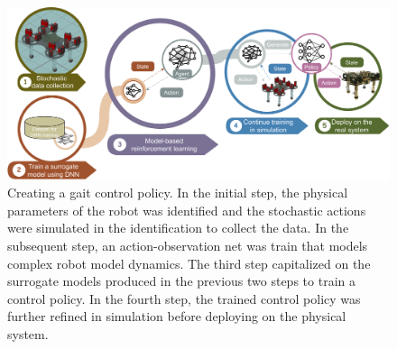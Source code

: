 \begin{figure}[ht]
    \centering
    \includegraphics[width=\linewidth]{img/chap3/experiment.pdf}
    \caption{Creating a gait control policy. In the initial step, the physical parameters of the robot was identified and the stochastic actions were simulated in the identification to collect the data. In the subsequent step, an action-observation net was train that models complex robot model dynamics. The third step capitalized on the surrogate models produced in the previous two steps to train a control policy. In the fourth step, the trained control policy was further refined in simulation before deploying on the physical system.}
    \label{fig:exp}
\end{figure}

